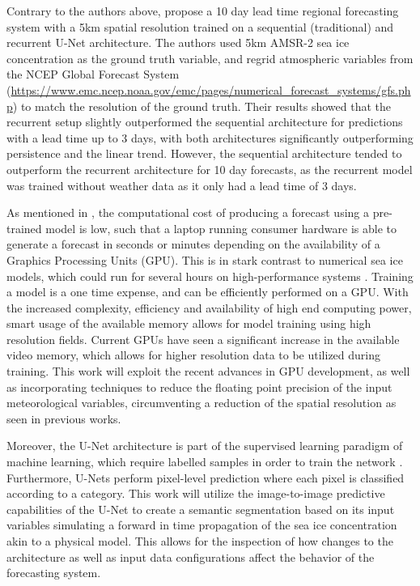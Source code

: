 \documentclass[../main/thesis.tex]{subfiles}
\begin{document}
Contrary to the authors above, \citet{Grigoryev2022} propose a 10 day lead time regional forecasting system with a 5km spatial resolution trained on a sequential (traditional) and recurrent U-Net architecture. The authors used 5km AMSR-2 sea ice concentration as the ground truth variable, and regrid atmospheric variables from the NCEP Global Forecast System (\url{https://www.emc.ncep.noaa.gov/emc/pages/numerical_forecast_systems/gfs.php}) to match the resolution of the ground truth. Their results showed that the recurrent setup slightly outperformed the sequential architecture for predictions with a lead time up to 3 days, with both architectures significantly outperforming persistence and the linear trend. However, the sequential architecture tended to outperform the recurrent architecture for 10 day forecasts, as the recurrent model was trained without weather data as it only had a lead time of 3 days.

As mentioned in \citep{Andersson2021, Fritzner2020}, the computational cost of producing a forecast using a pre-trained model is low, such that a laptop running consumer hardware is able to generate a forecast in seconds or minutes depending on the availability of a Graphics Processing Units (GPU). This is in stark contrast to numerical sea ice models, which could run for several hours on high-performance systems \citep{Andersson2021}. Training a model is a one time expense, and can be efficiently performed on a GPU. With the increased complexity, efficiency and availability of high end computing power, smart usage of the available memory allows for model training using high resolution fields. Current GPUs have seen a significant increase in the available video memory, which allows for higher resolution data to be utilized during training. This work will exploit the recent advances in GPU development, as well as incorporating techniques to reduce the floating point precision of the input meteorological variables, circumventing a reduction of the spatial resolution as seen in previous works.

Moreover, the U-Net architecture is part of the supervised learning paradigm of machine learning, which require labelled samples in order to train the network \citep{Ronneberger2015}. Furthermore, U-Nets perform pixel-level prediction where each pixel is classified according to a category. This work will utilize the image-to-image predictive capabilities of the U-Net to create a semantic segmentation based on its input variables simulating a forward in time propagation of the sea ice concentration akin to a physical model. This allows for the inspection of how changes to the architecture as well as input data configurations affect the behavior of the forecasting system.
\end{document}
